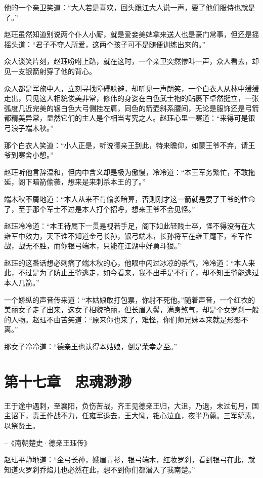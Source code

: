 他的一个亲卫笑道：“大人若是喜欢，回头跟江大人说一声，要了他们服侍也就是了。”

赵珏虽然知道别说两个仆人小厮，就是爱妾美婢拿来送人也是豪门常事，但还是摇摇头道：“君子不夺人所爱，这两个孩子可不是随便训练出来的。”

众人谈笑片刻，赵珏吩咐上路，就在这时，一个亲卫突然惨叫一声，众人看去，却见一支银箭射穿了他的背心。

众人都是军旅中人，立刻寻找障碍躲避，却听见一声朗笑，一个白衣人从林中缓缓走出，只见这人相貌俊美非常，修伟的身姿在白色武士袍的贴裹下卓然挺立，一张弧度几近完美的银白色大弓侧挂左肩，同色的箭壶斜系腰间，无论是服饰还是弓箭都精美异常，显然它们的主人是个相当考究之人。赵珏心里一寒道：“来得可是银弓浪子端木秋。”

那个白衣人笑道：“小人正是，听说德亲王到此，特来瞻仰，如蒙王爷不弃，请王爷到寒舍小憩。”

赵珏听他言辞温和，但内中含义却是极为傲慢，冷冷道：“本王军务繁忙，不敢拖延，阁下暗箭偷袭，想来是来刺杀本王的了。”

端木秋不屑地道：“本人从来不肯偷袭暗算，否则刚才这一箭就是要了王爷的性命了，至于那个军士不过是本人打个招呼，想来王爷不会见怪。”

赵珏冷冷道：“本王待属下一贯是视若手足，阁下如此轻贱士卒，怪不得没有在大雍军中效力，天下谁不知道金弓长孙，银弓端木，长孙将军在雍王麾下，率军作战，战无不胜，而你银弓端木，只能在江湖中好勇斗狠。”

赵珏的这番话想必刺痛了端木秋的心，他眼中闪过冰凉的杀气，冷冷道：“本人来此，不过是为了防止王爷逃走，如今看来，我不出手是不行了，却不知王爷能逃过本人几箭。”

一个娇纵的声音传来道：“本姑娘敢打包票，你射不死他。”随着声音，一个红衣的美丽女子走了出来，这女子相貌艳丽，但长眉入鬓，满身煞气，却是个女罗刹一般的人物。赵珏不由苦笑道：“原来你也来了，难怪，你们师兄妹本来就是形影不离。”

那女子冷冷道：“德亲王也认得本姑娘，倒是荣幸之至。”

\chapter{第十七章　忠魂渺渺}

王于途中遇刺，至襄阳，负伤苦战，齐王见德亲王归，大沮，乃退，未过旬月，国主诏下，责王作战不力，任雍军退去，王大恸，锥心泣血，夜半乃薨。三军缟素，以祭贤王。

--《南朝楚史·德亲王珏传》

赵珏平静地道：“金弓长孙，娥眉青衫，银弓端木，红妆罗刹，看到银弓在此，就知道火罗刹乔焰儿也必然在此，想不到你们都潜入了我南楚。”

